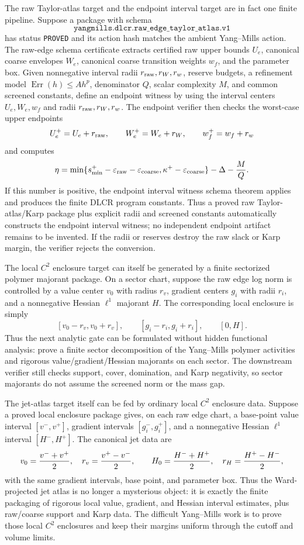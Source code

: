 The raw Taylor-atlas target and the endpoint interval target are in fact one
finite pipeline. Suppose a package with schema
\[
  \texttt{yangmills.dlcr.raw\_edge\_taylor\_atlas.v1}
\]
has status \texttt{PROVED} and its action hash matches the ambient
Yang--Mills action. The raw-edge schema certificate extracts certified raw
upper bounds $U_e$, canonical coarse envelopes $W_e$, canonical coarse
transition weights $w_f$, and the parameter box. Given nonnegative interval
radii $r_{\rm raw},r_W,r_w$, reserve budgets, a refinement model
$\operatorname{Err}(h)\leq A h^p$, denominator $Q$, scalar complexity $M$,
and common screened constants, define an endpoint witness by using the
interval centers $U_e,W_e,w_f$ and radii $r_{\rm raw},r_W,r_w$. The endpoint
verifier then checks the worst-case upper endpoints
\[
  U_e^+=U_e+r_{\rm raw},\qquad W_e^+=W_e+r_W,\qquad
  w_f^+=w_f+r_w
\]
and computes
\[
  \eta=\min\{s_{\min}^+-\varepsilon_{\rm raw}-\varepsilon_{\rm coarse},
             \kappa^+-\varepsilon_{\rm coarse}\}-\Delta-\frac{M}{Q}.
\]
If this number is positive, the endpoint interval witness schema theorem
applies and produces the finite DLCR program constants. Thus a proved raw
Taylor-atlas/Karp package plus explicit radii and screened constants
automatically constructs the endpoint interval witness; no independent
endpoint artifact remains to be invented. If the radii or reserves destroy the
raw slack or Karp margin, the verifier rejects the conversion.

The local $C^2$ enclosure target can itself be generated by a finite
sectorized polymer majorant package. On a sector chart, suppose the raw edge
log norm is controlled by a value center $v_0$ with radius $r_v$, gradient
centers $g_i$ with radii $r_i$, and a nonnegative Hessian $\ell^1$ majorant
$H$. The corresponding local enclosure is simply
\[
  [v_0-r_v,v_0+r_v],\qquad [g_i-r_i,g_i+r_i],\qquad [0,H].
\]
Thus the next analytic gate can be formulated without hidden functional
analysis: prove a finite sector decomposition of the Yang--Mills polymer
activities and rigorous value/gradient/Hessian majorants on each sector. The
downstream verifier still checks support, cover, domination, and Karp
negativity, so sector majorants do not assume the screened norm or the mass
gap.

The jet-atlas target itself can be fed by ordinary local $C^2$ enclosure data.
Suppose a proved local enclosure package gives, on each raw edge chart, a
base-point value interval $[v^-,v^+]$, gradient intervals
$[g_i^-,g_i^+]$, and a nonnegative Hessian $\ell^1$ interval $[H^-,H^+]$.
The canonical jet data are
\[
  v_0={v^-+v^+\over2},\quad r_v={v^+-v^-\over2},\qquad
  H_0={H^-+H^+\over2},\quad r_H={H^+-H^-\over2},
\]
with the same gradient intervals, base point, and parameter box. Thus the
Ward-projected jet atlas is no longer a mysterious object: it is exactly the
finite packaging of rigorous local value, gradient, and Hessian interval
estimates, plus raw/coarse support and Karp data. The difficult Yang--Mills
work is to prove those local $C^2$ enclosures and keep their margins uniform
through the cutoff and volume limits.

